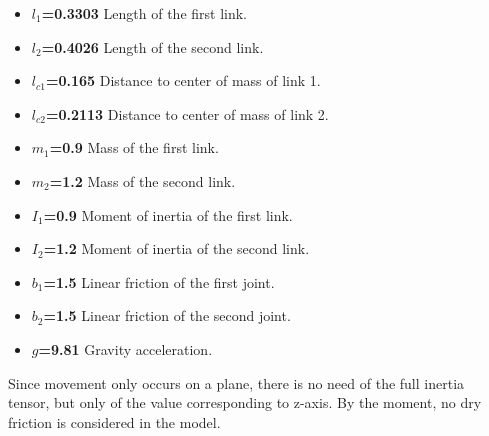 \documentclass[9pt,spanish,aspectratio=1610]{beamer}
\begin{document}
\begin{frame}
\begin{columns}
\begin{column}{0.25\textwidth}
    \end{column}
    \begin{column}{0.6\textwidth}
      \begin{itemize}
      \item \textbf{$l_1$=0.3303} Length of the first link.
      \item \textbf{$l_2$=0.4026} Length of the second link.
      \item \textbf{$l_{c1}$=0.165} Distance to center of mass of link 1.
      \item \textbf{$l_{c2}$=0.2113} Distance to center of mass of link 2.
      \item \textbf{$m_1$=0.9} Mass of the first link.
      \item \textbf{$m_2$=1.2} Mass of the second link.
      \item \textbf{$I_1$=0.9} Moment of inertia of the first link.
      \item \textbf{$I_2$=1.2} Moment of inertia of the second link.
      \item \textbf{$b_1$=1.5} Linear friction of the first joint.
      \item \textbf{$b_2$=1.5} Linear friction of the second joint.
      \item \textbf{$g$=9.81} Gravity acceleration.
      \end{itemize}
      Since movement only occurs on a plane, there is no need of the full inertia tensor, but only of the value corresponding to z-axis. By the moment, no dry friction is considered in the model. 
    \end{column}
  \end{columns}
\end{frame}
\end{document}

